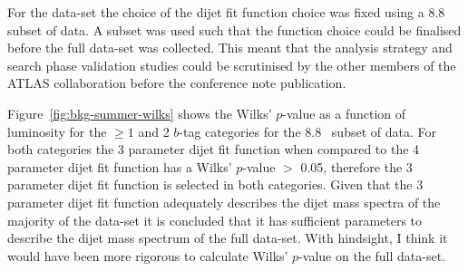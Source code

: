 For the \summer{} data-set the choice of the dijet fit function choice was fixed using a 8.8~\ifb{} subset of data.
A subset was used such that the function choice could be finalised before the full data-set was collected.
This meant that the analysis strategy and search phase validation studies could be scrutinised by the other members of the ATLAS collaboration before the conference note publication.

Figure~\ref{fig:bkg-summer-wilks} shows the Wilks' \mbox{$p$-value} as a function of luminosity
for the $\geq1$ and 2 \mbox{$b$-tag} categories for the 8.8~\ifb{} subset of data.
For both categories the 3 parameter dijet fit function when compared to the 4 parameter dijet fit function
has a Wilks' \mbox{$p$-value} $>$ 0.05,
therefore the 3 parameter dijet fit function is selected in both categories.
Given that the 3 parameter dijet fit function adequately describes the dijet mass spectra of the
majority of the data-set it is concluded that it has sufficient parameters to describe the dijet mass spectrum of the full data-set.
With hindsight, I think it would have been more rigorous to calculate Wilks' \mbox{$p$-value} on the full data-set.

\vfill
\newpage

